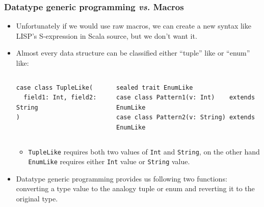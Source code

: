 \begin{frame}[fragile]
  \frametitle{Datatype generic programming \textit{vs.} Macros}

  \begin{itemize}
    \item Unfortunately if we would use raw macros, we can create a new syntax like LISP's S-expression in Scala source,
    but we don't want it.

    \item Almost every data structure can be classified either ``tuple'' like or ``enum'' like:
    \begin{columns}
      \begin{column}{0.4\textwidth}
\begin{lstlisting}[style=scala]
case class TupleLike(
  field1: Int, field2: String
)
\end{lstlisting}
      \end{column}
      \begin{column}{0.6\textwidth}
\begin{lstlisting}[style=scala]
sealed trait EnumLike
case class Pattern1(v: Int)    extends EnumLike
case class Pattern2(v: String) extends EnumLike
\end{lstlisting}
      \end{column}
    \end{columns}
    \begin{itemize}
      \item \lstinline|TupleLike| requires both two values of \lstinline|Int| and \lstinline|String|,
      on the other hand \lstinline|EnumLike| requires either \lstinline|Int| value or \lstinline|String| value.
    \end{itemize}

    \item Datatype generic programming provides us following two functions: 
       converting a type value to the analogy tuple or enum and
       reverting it to the original type.
  \end{itemize}

\end{frame}
